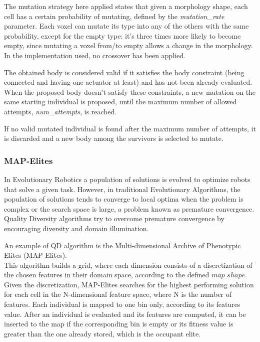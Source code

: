 The mutation strategy here applied states that given a morphology shape, each cell has a certain probability of mutating, defined by the \textit{mutation\_rate} parameter.
Each voxel can mutate its type into any of the others with the same probability, except for the empty type: it's three times more likely to become empty, since mutating a voxel from/to empty allows a change in the morphology. In the implementation used, no crossover has been applied.

The obtained body is considered valid if it satisfies the body constraint (being connected and having one actuator at least) and has not been already evaluated.
When the proposed body doesn't satisfy these constraints, a new mutation on the same starting individual is proposed, until the maximum number of allowed attempts, \textit{num\_attempts}, is reached.

If no valid mutated individual is found after the maximum number of attempts, it is discarded and a new body among the survivors is selected to mutate.\\


\subsubsection{MAP-Elites}
In Evolutionary Robotics a population of solutions is evolved to optimize robots that solve a given task. However, in traditional Evolutionary Algorithms, the population of solutions
tends to converge to local optima when the problem is complex or the search space is large, a problem known as premature convergence. Quality Diversity algorithms try to overcome premature convergence \cite{nordmoen2020quality} by encouraging diversity and domain illumination.

An example of QD algorithm is the Multi-dimensional Archive of Phenotypic Elites (MAP-Elites).\\
This algorithm builds a grid, where each dimension consists of a discretization of the chosen features in their domain space, according to the defined $map\_shape$.
Given the discretization, MAP-Elites searches for the highest performing solution for each cell in the N-dimensional feature space\cite{mapelites}, where N is the number of features.
Each individual is mapped to one bin only, according to its features value.
After an individual is evaluated and its features are computed, it can be inserted to the map if the corresponding bin is empty or its fitness value is greater than the one already stored, which is the occupant elite.

